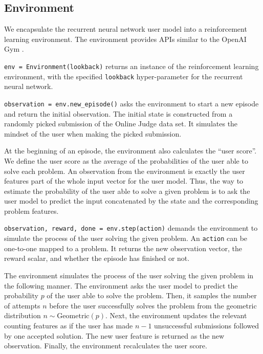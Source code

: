     \subsection{Environment}

        We encapsulate the recurrent neural network user model into a reinforcement learning environment.
        The environment provides APIs similar to the OpenAI Gym \cite{brockman_openai_2016}.

        \verb|env = Environment(lookback)| returns an instance of the reinforcement learning environment,
        with the specified \verb|lookback| hyper-parameter for the recurrent neural network.

        \verb|observation = env.new_episode()| asks the environment to start a new episode and return the initial observation.
        The initial state is constructed from a randomly picked submission of the Online Judge data set.
        It simulates the mindset of the user when making the picked submission.

        At the beginning of an episode, the environment also calculates the ``user score''.
        We define the user score as the average of the probabilities of the user able to solve each problem.
        An observation from the environment is exactly the user features part of the whole input vector for the user model.
        Thus, the way to estimate the probability of the user able to solve a given problem
        is to ask the user model to predict the input concatenated by the state and the corresponding problem features.

        \verb|observation, reward, done = env.step(action)|
        demands the environment to simulate the process of the user solving the given problem.
        An \verb|action| can be one-to-one mapped to a problem.
        It returns the new observation vector, the reward scalar, and whether the episode has finished or not.

        The environment simulates the process of the user solving the given problem in the following manner.
        The environment asks the user model to predict the probability $p$ of the user able to solve the problem.
        Then, it samples the number of attempts $n$ before the user successfully solves the problem
        from the geometric distribution $n \sim \mathrm{Geometric}(p)$.
        Next, the environment updates the relevant counting features
        as if the user has made $n-1$ unsuccessful submissions followed by one accepted solution.
        The new user feature is returned as the new observation.
        Finally, the environment recalculates the user score.

